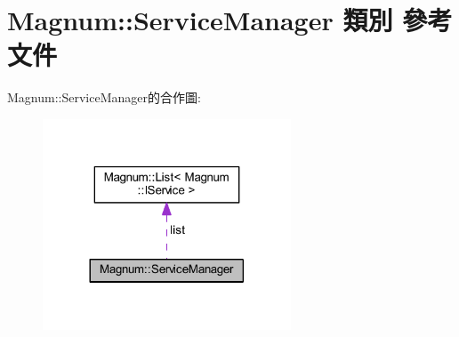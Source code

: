 \hypertarget{class_magnum_1_1_service_manager}{}\section{Magnum\+:\+:Service\+Manager 類別 參考文件}
\label{class_magnum_1_1_service_manager}


Magnum\+:\+:Service\+Manager的合作圖\+:\nopagebreak
\begin{figure}[H]
\begin{center}
\leavevmode
\includegraphics[width=209pt]{class_magnum_1_1_service_manager__coll__graph}
\end{center}
\end{figure}
